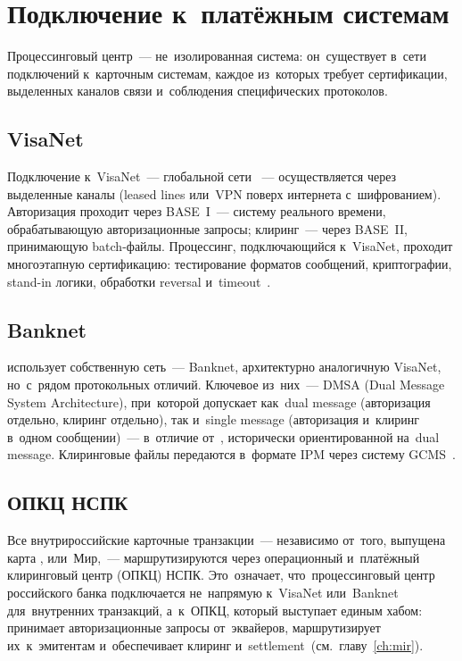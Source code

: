 \section{Подключение к~платёжным системам}
\label{sec:pc-connectivity}

Процессинговый центр~--- не~изолированная система: он~существует
в~сети подключений к~карточным системам, каждое из~которых
требует сертификации, выделенных каналов связи и~соблюдения
специфических протоколов.

\subsection*{VisaNet}

Подключение к~VisaNet~--- глобальной сети ~---
осуществляется через выделенные каналы (leased lines
или~VPN поверх интернета с~шифрованием). Авторизация проходит
через BASE~I~--- систему реального времени, обрабатывающую
авторизационные запросы; клиринг~--- через BASE~II, принимающую
batch-файлы. Процессинг, подключающийся к~VisaNet, проходит
многоэтапную сертификацию: тестирование форматов сообщений,
криптографии, stand-in логики, обработки reversal
и~timeout~.

\subsection*{Banknet}

 использует собственную сеть~--- Banknet,
архитектурно аналогичную VisaNet, но~с~рядом протокольных
отличий. Ключевое из~них~--- DMSA (Dual Message System
Architecture), при~которой  допускает как~dual
message (авторизация отдельно, клиринг отдельно), так и~single
message (авторизация и~клиринг в~одном сообщении)~---
в~отличие от~, исторически ориентированной
на~dual message. Клиринговые файлы 
передаются в~формате IPM через систему
GCMS~.

\subsection*{ОПКЦ НСПК}

Все внутрироссийские карточные транзакции~--- независимо
от~того, выпущена карта , 
или~Мир,~--- маршрутизируются через операционный и~платёжный
клиринговый центр (ОПКЦ) НСПК. Это~означает, что~процессинговый
центр российского банка подключается не~напрямую к~VisaNet
или~Banknet для~внутренних транзакций, а~к~ОПКЦ, который
выступает единым хабом: принимает авторизационные запросы
от~эквайеров, маршрутизирует их~к~эмитентам и~обеспечивает
клиринг и~settlement~(см.~главу~\ref{ch:mir}).


